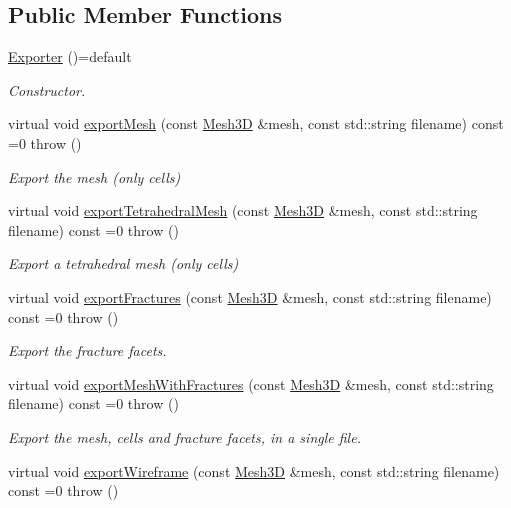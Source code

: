\subsection*{Public Member Functions}
\begin{DoxyCompactItemize}
\item 
\hyperlink{classFVCode3D_1_1Exporter_aaf2a9defa7f66910e9a52645d06a1f24}{Exporter} ()=default
\begin{DoxyCompactList}\small\item\em Constructor. \end{DoxyCompactList}\item 
virtual void \hyperlink{classFVCode3D_1_1Exporter_ae5b548e912eefe8cfb3abc5668811c96}{export\+Mesh} (const \hyperlink{classFVCode3D_1_1Mesh3D}{Mesh3D} \&mesh, const std\+::string filename) const =0  throw ()
\begin{DoxyCompactList}\small\item\em Export the mesh (only cells) \end{DoxyCompactList}\item 
virtual void \hyperlink{classFVCode3D_1_1Exporter_a1a447304dbc2e9c6e3fd5c927c3b1811}{export\+Tetrahedral\+Mesh} (const \hyperlink{classFVCode3D_1_1Mesh3D}{Mesh3D} \&mesh, const std\+::string filename) const =0  throw ()
\begin{DoxyCompactList}\small\item\em Export a tetrahedral mesh (only cells) \end{DoxyCompactList}\item 
virtual void \hyperlink{classFVCode3D_1_1Exporter_a7378cba45e2de9095c262083690c0c50}{export\+Fractures} (const \hyperlink{classFVCode3D_1_1Mesh3D}{Mesh3D} \&mesh, const std\+::string filename) const =0  throw ()
\begin{DoxyCompactList}\small\item\em Export the fracture facets. \end{DoxyCompactList}\item 
virtual void \hyperlink{classFVCode3D_1_1Exporter_a8e4f11391f7800efde28631155d8b584}{export\+Mesh\+With\+Fractures} (const \hyperlink{classFVCode3D_1_1Mesh3D}{Mesh3D} \&mesh, const std\+::string filename) const =0  throw ()
\begin{DoxyCompactList}\small\item\em Export the mesh, cells and fracture facets, in a single file. \end{DoxyCompactList}\item 
virtual void \hyperlink{classFVCode3D_1_1Exporter_a1ba47d531dc311a084698ac1a57bf929}{export\+Wireframe} (const \hyperlink{classFVCode3D_1_1Mesh3D}{Mesh3D} \&mesh, const std\+::string filename) const =0  throw ()

\end{DoxyCompactItemize}
